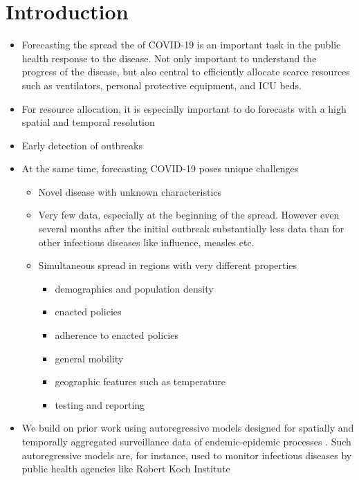 \documentclass{article}
\begin{document}
\section{Introduction}
\label{sec:orgc60d05b}
\begin{itemize}
\item Forecasting the spread the of COVID-19 is an important task in the public
health response to the disease. Not only important to understand the progress
of the disease, but also central to efficiently allocate scarce resources such
as ventilators, personal protective equipment, and ICU beds.
\item For resource allocation, it is especially important to do forecasts with a
high spatial and temporal resolution
\item Early detection of outbreaks
\item At the same time, forecasting COVID-19 poses unique challenges
\begin{itemize}
\item Novel disease with unknown characteristics
\item Very few data, especially at the beginning of the spread. However even
several months after the initial outbreak substantially less data than for other
infectious diseases like influence, measles etc.
\item Simultaneous spread in regions with very different properties
\begin{itemize}
\item demographics and population density
\item enacted policies
\item adherence to enacted policies
\item general mobility
\item geographic features such as temperature
\item testing and reporting
\end{itemize}
\end{itemize}
\item We build on prior work using autoregressive models designed for spatially and
temporally aggregated surveillance data of endemic-epidemic processes
\citep{held2005statistical,meyer2014powerlaw,meyer2016socialcontact}. Such
autoregressive models are, for instance, used to monitor infectious diseases
by public health agencies like Robert Koch Institute \citep{salmon2016surveillance}
\end{itemize}
\end{document}
